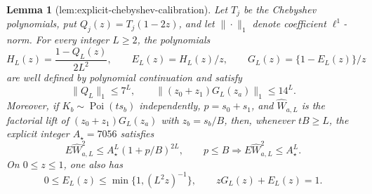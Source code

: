 \documentclass{article}
\newtheorem{lemma}{Lemma}
\begin{document}
\begin{lemma}[lem:explicit-chebyshev-calibration]\label{lem:explicit-chebyshev-calibration}
Let \(T_j\) be the Chebyshev polynomials, put \(Q_j(z)=T_j(1-2z)\), and let \(\|\cdot\|_1\) denote coefficient \(\ell^1\)-norm.  For every integer \(L\ge2\), the polynomials
\[
 H_L(z)=\frac{1-Q_L(z)}{2L^2},\qquad E_L(z)=H_L(z)/z,
 \qquad G_L(z)=\{1-E_L(z)\}/z
\]
are well defined by polynomial continuation and satisfy
\[
 \|Q_L\|_1\le7^L,\qquad
 \|(z_0+z_1)G_L(z_a)\|_1\le14^L.                                   \tag{C7}
\]
Moreover, if \(K_b\sim\operatorname{Poi}(ts_b)\) independently, \(p=s_0+s_1\), and \(\widehat W_{a,L}\) is the factorial lift of \((z_0+z_1)G_L(z_a)\) with \(z_b=s_b/B\), then, whenever \(tB\ge L\), the explicit integer \(A_\star=7056\) satisfies
\[
 E\widehat W_{a,L}^{2}\le A_\star^L(1+p/B)^{2L},
 \qquad
 p\le B\Longrightarrow E\widehat W_{a,L}^{2}\le A_\star^L.       \tag{C8}
\]
On \(0\le z\le1\), one also has
\[
 0\le E_L(z)\le\min\{1,(L^2z)^{-1}\},\qquad zG_L(z)+E_L(z)=1.     \tag{C9}
\]
\end{lemma}
\end{document}
